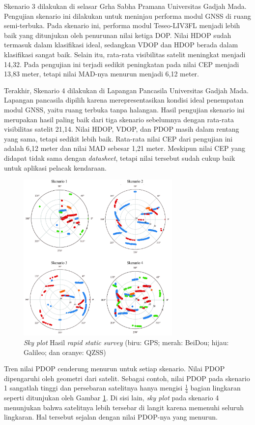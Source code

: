 \documentclass[conference]{IEEEtran}
\begin{document}
Skenario 3 dilakukan di selasar Grha Sabha Pramana Universitas Gadjah Mada. Pengujian skenario ini dilakukan untuk meninjau performa modul GNSS di ruang semi-terbuka. Pada skenario ini, performa modul Teseo-LIV3FL menjadi lebih baik yang ditunjukan oleh penurunan nilai ketiga DOP. Nilai HDOP sudah termasuk dalam klasifikasi ideal, sedangkan VDOP dan HDOP berada dalam klasifikasi sangat baik. Selain itu, rata-rata visibilitas satelit meningkat menjadi 14,32. Pada pengujian ini terjadi sedikit peningkatan pada nilai CEP menjadi 13,83 meter, tetapi nilai MAD-nya menurun menjadi 6,12 meter.

 Terakhir, Skenario 4 dilakukan di Lapangan Pancasila Universitas Gadjah Mada. Lapangan pancasila dipilih karena merepresentasikan kondisi ideal penempatan modul GNSS, yaitu ruang terbuka tanpa halangan. Hasil pengujian skenario ini merupakan hasil paling baik dari tiga skenario sebelumnya dengan rata-rata visibilitas satelit 21,14. Nilai HDOP, VDOP, dan PDOP masih dalam rentang yang sama, tetapi sedikit lebih baik. Rata-rata nilai CEP dari pengujian ini adalah 6,12 meter  dan nilai MAD sebesar 1,21 meter. Meskipun nilai CEP yang didapat tidak sama dengan \textit{datasheet}, tetapi nilai tersebut sudah cukup baik untuk aplikasi pelacak kendaraan.

\begin{figure}[htb!]
	\centering
	\includegraphics[width=8cm]{skyplot.jpg}
	\caption{\textit{Sky plot} Hasil \textit{rapid static survey} (biru: GPS; merah: BeiDou; hijau: Galileo; dan oranye: QZSS)}
	\label{fig: 4-skyplot}
\end{figure}

Tren nilai PDOP cenderung menurun untuk setiap skenario. Nilai PDOP dipengaruhi oleh geometri dari satelit. Sebagai contoh, nilai PDOP pada skenario 1 sangatlah tinggi dan persebaran satelitnya hanya mengisi $\frac{1}{4}$ bagian lingkaran seperti ditunjukan oleh Gambar \ref{fig: 4-skyplot}. Di sisi lain, \textit{sky plot} pada skenario 4 menunjukan bahwa satelitnya lebih tersebar di langit karena memenuhi seluruh lingkaran. Hal tersebut sejalan dengan nilai PDOP-nya yang menurun.
\end{document}

